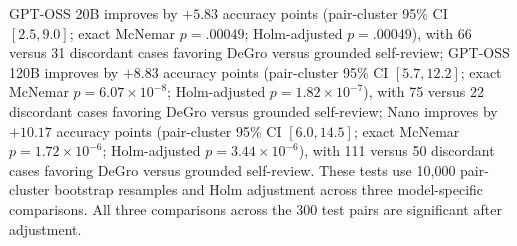 GPT-OSS 20B improves by $+5.83$ accuracy points (pair-cluster 95\% CI $[2.5,9.0]$; exact McNemar $p=.00049$; Holm-adjusted $p=.00049$), with 66 versus 31 discordant cases favoring DeGro versus grounded self-review; GPT-OSS 120B improves by $+8.83$ accuracy points (pair-cluster 95\% CI $[5.7,12.2]$; exact McNemar $p=6.07\times 10^{-8}$; Holm-adjusted $p=1.82\times 10^{-7}$), with 75 versus 22 discordant cases favoring DeGro versus grounded self-review; Nano improves by $+10.17$ accuracy points (pair-cluster 95\% CI $[6.0,14.5]$; exact McNemar $p=1.72\times 10^{-6}$; Holm-adjusted $p=3.44\times 10^{-6}$), with 111 versus 50 discordant cases favoring DeGro versus grounded self-review. These tests use 10,000 pair-cluster bootstrap resamples and Holm adjustment across three model-specific comparisons. All three comparisons across the 300 test pairs are significant after adjustment.
